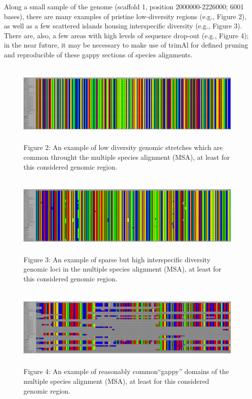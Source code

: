 \documentclass[12pt]{report}
\begin{document}
 Along a small sample of the genome (scaffold 1, position 2000000-2226000; 6001 bases), there are many examples of pristine low-diversity regions (e.g., Figure 2), as well as a few scattered islands housing interspecific diversity (e.g., Figure 3).  There are, also, a few areas with high levels of sequence drop-out (e.g., Figure 4); in the near future, it may be necessary to make use of trimAl \cite{capella2009} for defined pruning and reproducible of these gappy sections of species alignments.

 \begin{figure}[!h]
         \centering
         \includegraphics[height=4cm]{Images/SeaViewMSA_1.PNG}
         \caption{Figure 2: An example of low diversity genomic stretches which are common throught the multiple species alignment (MSA), at least for this considered genomic region.}
 \end{figure}

 \begin{figure}[!h]
         \centering
         \includegraphics[height=4cm]{Images/SeaViewMSA_2.PNG}
         \caption{Figure 3: An example of sparse but high interspecific diversity genomic loci in the multiple species alignment (MSA), at least for this considered genomic region.}
 \end{figure}

 \begin{figure}[!h]
         \centering
         \includegraphics[height=4cm]{Images/SeaViewMSA_3.PNG}
         \caption{Figure 4: An example of reasonably common``gappy'' domains of the multiple species alignment (MSA), at least for this considered genomic region.}
 \end{figure}


\end{document}
